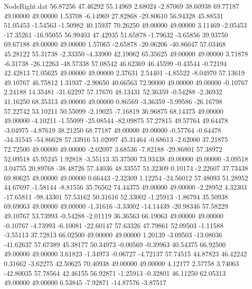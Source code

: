 \begin{filecontents}{NodeRight.dat}
  56.87256   47.46292   55.14969     2.68024   -2.87069   38.60938   69.77187   49.00000   49.00000    1.53708   -6.14969   27.82868  -29.80610
  56.94328   45.88531   51.05453    -1.54563   -1.50982   40.15937   70.26250   49.00000   49.00000    3.11469   -2.05453  -17.35261  -16.95055
  56.99403   47.42935   51.65878    -1.79632   -3.65856   39.93750   69.67188   49.00000   49.00000    1.57065   -2.65878  -20.06206  -40.86047
  57.03468   45.28122   55.31738    -2.33350   -4.33900   42.19062   65.35625   49.00000   49.00000    3.71878   -6.31738  -26.12263  -48.57338
  57.08542   46.62369   46.45599    -0.43544   -0.72194   42.42813   71.05625   49.00000   49.00000    2.37631    2.54401   -4.85522   -8.04970
  57.13619   49.10767   46.75812     1.31937   -2.90650   40.66563   72.90000   49.00000   49.00000   -0.10767    2.24188   14.35481  -31.62297
  57.17670   48.13431   52.36359    -0.54288   -2.36932   41.16250   68.35313   49.00000   49.00000    0.86569   -3.36359   -5.99586  -26.16798
  57.22742   53.10211   50.55099    -2.19025   -7.16819   36.96875   68.14375   49.00000   49.00000   -4.10211   -1.55099  -25.08544  -82.09875
  57.27815   49.57764   49.64478    -3.04975   -4.87619   38.21250   68.77187   49.00000   49.00000   -0.57764   -0.64478  -34.31545  -54.86628
  57.33916   51.02097   45.31464    -0.68613   -2.62000   37.21875   72.72500   49.00000   49.00000   -2.02097    3.68536   -7.82188  -29.86801
  57.38972   52.09518   45.95245     1.92818   -3.55113   35.37500   73.93438   49.00000   49.00000   -3.09518    3.04755   20.89768  -38.48726
  57.44036   48.33557   51.32309     0.10174   -2.22607   37.73438   69.80625   49.00000   49.00000    0.66443   -2.32309    1.12254  -24.56012
  57.48093   51.28952   44.67697    -1.58144   -8.81556   35.76562   74.44375   49.00000   49.00000   -2.28952    4.32303  -17.65811  -98.43301
  57.53162   50.31616   52.33002    -1.25913   -1.86794   35.50938   69.69063   49.00000   49.00000   -1.31616   -3.33002  -14.14439  -20.98346
  57.58229   49.10767   53.73993    -0.54288   -2.01119   36.36563   66.19063   49.00000   49.00000   -0.10767   -4.73993   -6.10081  -22.60147
  57.63326   47.79861   52.09503    -1.11588   -3.55113   37.72813   66.02500   49.00000   49.00000    1.20139   -3.09503  -13.08036  -41.62637
  57.67389   45.38177   50.34973    -0.00569   -0.39963   40.54375   66.92500   49.00000   49.00000    3.61823   -1.34973   -0.06727   -4.72137
  57.74515   44.87823   46.42242     0.31662   -3.62275   42.50625   70.40938   49.00000   49.00000    4.12177    2.57758    3.74063  -42.80035
  57.78564   42.46155   56.92871    -1.25913   -0.32801   46.11250   62.05313   49.00000   49.00000    6.53845   -7.92871  -14.87576   -3.87517

\end{filecontents}
